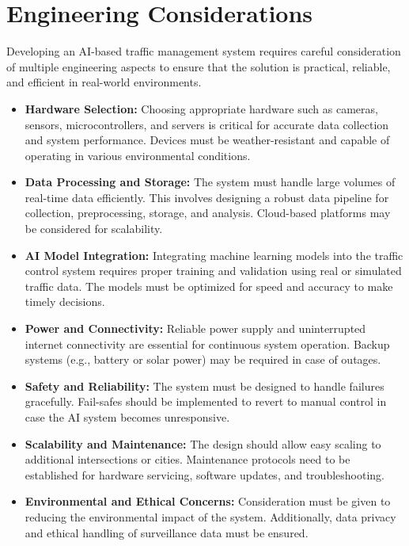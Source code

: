 \chapter{Engineering Considerations}
Developing an AI-based traffic management system requires careful consideration of multiple engineering aspects to ensure that the solution is practical, reliable, and efficient in real-world environments.

\begin{itemize}
    \item \textbf{Hardware Selection:}  
    Choosing appropriate hardware such as cameras, sensors, microcontrollers, and servers is critical for accurate data collection and system performance. Devices must be weather-resistant and capable of operating in various environmental conditions.

    \item \textbf{Data Processing and Storage:}  
    The system must handle large volumes of real-time data efficiently. This involves designing a robust data pipeline for collection, preprocessing, storage, and analysis. Cloud-based platforms may be considered for scalability.

    \item \textbf{AI Model Integration:}  
    Integrating machine learning models into the traffic control system requires proper training and validation using real or simulated traffic data. The models must be optimized for speed and accuracy to make timely decisions.

    \item \textbf{Power and Connectivity:}  
    Reliable power supply and uninterrupted internet connectivity are essential for continuous system operation. Backup systems (e.g., battery or solar power) may be required in case of outages.

    \item \textbf{Safety and Reliability:}  
    The system must be designed to handle failures gracefully. Fail-safes should be implemented to revert to manual control in case the AI system becomes unresponsive.

    \item \textbf{Scalability and Maintenance:}  
    The design should allow easy scaling to additional intersections or cities. Maintenance protocols need to be established for hardware servicing, software updates, and troubleshooting.

    \item \textbf{Environmental and Ethical Concerns:}  
    Consideration must be given to reducing the environmental impact of the system. Additionally, data privacy and ethical handling of surveillance data must be ensured.
\end{itemize}

